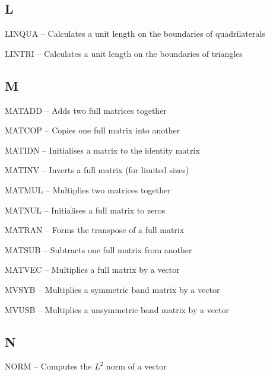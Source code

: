 \subsection*{L} %
\begin{list}{}{\leftmargin=80pt  \itemsep=0pt}
\item[LINQUA \hfill] -- Calculates a unit length on the boundaries of quadrilaterals
\item[LINTRI \hfill] -- Calculates a unit length on the boundaries of triangles
\end{list}
\subsection*{M} %
\begin{list}{}{\leftmargin=80pt  \itemsep=0pt}
\item[MATADD \hfill] -- Adds two full matrices together
\item[MATCOP \hfill] -- Copies one full matrix into another
\item[MATIDN \hfill] -- Initialises a matrix to the identity matrix
\item[MATINV \hfill] -- Inverts a full matrix (for limited sizes)
\item[MATMUL \hfill] -- Multiplies two matrices together
\item[MATNUL \hfill] -- Initialises a full matrix to zeros
\item[MATRAN \hfill] -- Forms the transpose of a full matrix
\item[MATSUB \hfill] -- Subtracts one full matrix from another
\item[MATVEC \hfill] -- Multiplies a full matrix by a vector
\item[MVSYB \hfill]  -- Multiplies a symmetric band matrix by a vector
\item[MVUSB \hfill]  -- Multiplies a unsymmetric band matrix by a vector%
\end{list}
\subsection*{N} %
\begin{list}{}{\leftmargin=80pt  \itemsep=0pt}
\item[NORM \hfill]   -- Computes the $L^2$ norm of a vector
\end{list}
